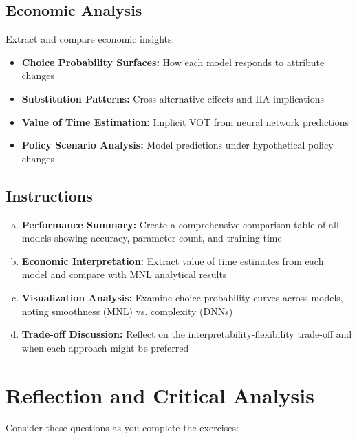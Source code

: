 \documentclass[11pt]{article}
\begin{document}
\subsection*{Economic Analysis}

Extract and compare economic insights:
\begin{itemize}
\item \textbf{Choice Probability Surfaces:} How each model responds to attribute changes
\item \textbf{Substitution Patterns:} Cross-alternative effects and IIA implications
\item \textbf{Value of Time Estimation:} Implicit VOT from neural network predictions
\item \textbf{Policy Scenario Analysis:} Model predictions under hypothetical policy changes
\end{itemize}

\subsection*{Instructions}

\begin{enumerate}[(a)]
\item \textbf{Performance Summary:} Create a comprehensive comparison table of all models showing accuracy, parameter count, and training time
\item \textbf{Economic Interpretation:} Extract value of time estimates from each model and compare with MNL analytical results
\item \textbf{Visualization Analysis:} Examine choice probability curves across models, noting smoothness (MNL) vs. complexity (DNNs)
\item \textbf{Trade-off Discussion:} Reflect on the interpretability-flexibility trade-off and when each approach might be preferred
\end{enumerate}

\section*{Reflection and Critical Analysis}

Consider these questions as you complete the exercises:
\end{document}
